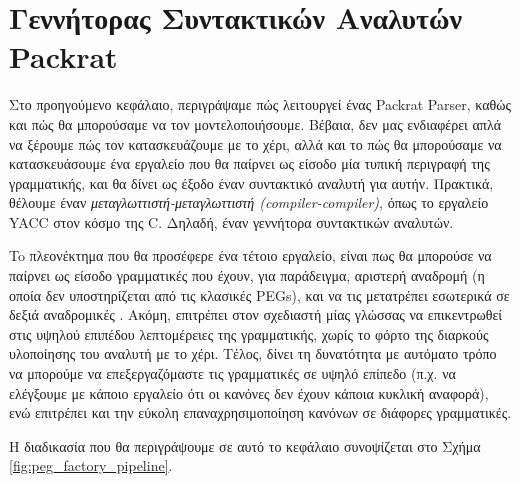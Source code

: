 \chapter{ Γεννήτορας Συντακτικών Αναλυτών Packrat }
\label{ch:packrat_gen}

Στο προηγούμενο κεφάλαιο, περιγράψαμε πώς λειτουργεί ένας Packrat Parser, καθώς και πώς θα μπορούσαμε να τον μοντελοποιήσουμε. 
Βέβαια, δεν μας ενδιαφέρει απλά να ξέρουμε πώς τον κατασκευάζουμε με το χέρι, αλλά και το πώς θα μπορούσαμε να κατασκευάσουμε ένα εργαλείο που θα παίρνει ως είσοδο μία τυπική περιγραφή της γραμματικής, και θα δίνει ως έξοδο έναν συντακτικό αναλυτή για αυτήν.
Πρακτικά, θέλουμε έναν \textit{μεταγλωττιστή-μεταγλωττιστή (compiler-compiler)}, όπως το εργαλείο YACC στον κόσμο της C. Δηλαδή, έναν γεννήτορα συντακτικών αναλυτών.

To πλεονέκτημα που θα προσέφερε ένα τέτοιο εργαλείο, είναι πως θα μπορούσε να παίρνει ως είσοδο γραμματικές που έχουν, για παράδειγμα, αριστερή αναδρομή (η οποία δεν υποστηρίζεται από τις κλασικές PEGs), και να τις μετατρέπει εσωτερικά σε δεξιά αναδρομικές \cite{Ford2002a}.
Ακόμη, επιτρέπει στον σχεδιαστή μίας γλώσσας να επικεντρωθεί στις υψηλού επιπέδου λεπτομέρειες της γραμματικής, χωρίς το φόρτο της διαρκούς υλοποίησης του αναλυτή με το χέρι. 
Τέλος, δίνει τη δυνατότητα με αυτόματο τρόπο να μπορούμε να επεξεργαζόμαστε τις γραμματικές σε υψηλό επίπεδο (π.χ. να ελέγξουμε με κάποιο εργαλείο ότι οι κανόνες δεν έχουν κάποια κυκλική αναφορά), ενώ επιτρέπει και την εύκολη επαναχρησιμοποίηση κανόνων σε διάφορες γραμματικές.

Η διαδικασία που θα περιγράψουμε σε αυτό το κεφάλαιο συνοψίζεται στο Σχήμα \ref{fig:peg_factory_pipeline}. %

